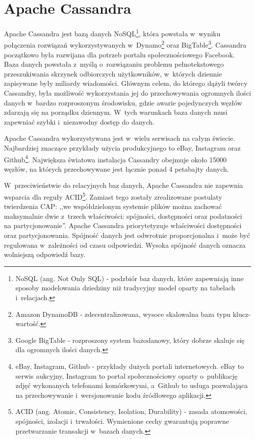 
\chapter{Apache Cassandra}
\label{chap:apache_cassandra}

Apache Cassandra jest bazą danych NoSQL\footnote{NoSQL (ang. Not Only SQL) - podzbiór baz danych, które zapewniają inne sposoby modelowania dziedziny niż tradycyjny model oparty na tabelach i~relacjach.}, która powstała w~wyniku połączenia rozwiązań wykorzystywanych w~Dynamo\footnote{Amazon DynamoDB - zdecentralizowana, wysoce skalowalna baza typu klucz-wartość.} oraz BigTable\footnote{Google BigTable - rozproszony system bazodanowy, który dobrze skaluje się dla ogromnych ilości danych.}. Cassandra początkowo była rozwijana dla potrzeb portalu społecznościowego Facebook. Baza danych powstała z~myślą o~rozwiązaniu problemu pełnotekstowego przeszukiwania skrzynek odbiorczych użytkowników, w~których dziennie zapisywane były miliardy wiadomości. Głównym celem, do którego dążyli twórcy Cassandry, była możliwość wykorzystania jej do przechowywania ogromnych ilości danych w~bardzo rozproszonym środowisku, gdzie awarie pojedynczych węzłów zdarzają się na porządku dziennym. W~tych warunkach baza danych musi zapewniać szybki i~niezawodny dostęp do danych. \cite{cassandra_introduction} 

Apache Cassandra wykorzystywana jest w~wielu serwisach na całym świecie. Najbardziej znaczące przykłady użycia produkcyjnego to eBay, Instagram oraz Github\footnote{eBay, Instagram, Github - przykłady dużych portali internetowych. eBay to serwis aukcyjny, Instagram to portal społecznościowy oparty o~publikację zdjęć wykonanych telefonami komórkowymi, a~Github to usługa pozwalająca na przechowywanie i~wersjonowanie kodu źródłowego aplikacji.}. Największa światowa instalacja Cassandry obejmuje około 15000 węzłów, na których przechowywane jest łącznie ponad 4 petabajty danych. \cite{official_cassandra}

W~przeciwieństwie do relacyjnych baz danych, Apache Cassandra nie zapewnia wsparcia dla reguły ACID\footnote{ACID (ang. Atomic, Consistency, Isolation, Durability) - zasada atomowości, spójności, izolacji i~trwałości. Wymienione cechy gwarantują poprawne przetwarzanie transakcji w~bazach danych.}. Zamiast tego zostały zrealizowane postulaty twierdzenia CAP: ,,we współdzielonym systemie plików można zachować maksymalnie dwie z~trzech właściwości: spójności, dostępności oraz podatności na partycjonowanie''. \cite{cap_theorem} Apache Cassandra priorytetyzuje właściwości dostępności oraz partycjonowania. Spójność danych jest odwrotnie proporcjonalna i~może być regulowana w~zależności od czasu odpowiedzi. Wysoka spójność danych oznacza wolniejszą odpowiedź bazy.

